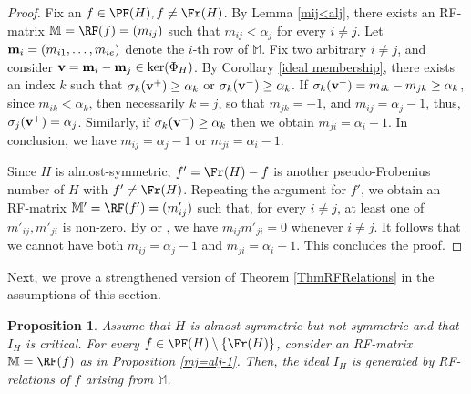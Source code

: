 \documentclass[11pt,twoside]{amsart}
\newcommand{\MM}{\mathbb M}
\def\bv{{\mathbf v}}
\def\al{\alpha}
\newtheorem{prop}[Theorem]{Proposition}
\theoremstyle{definition}
\numberwithin{equation}{section}
\begin{document}
\begin{proof}
Fix an $f \in \PF(H), f \ne \Fr(H)$.
By Lemma \ref{mij<alj},
there exists an RF-matrix   $\MM = \RF(f)= (m_{ij})$ 
 such that  $m_{ij}< \al_j$ for every $i\ne j$.
Let  ${\bf m}_i = (m_{i1},  \ldots , m_{ie})$ denote the 
$i$-th row of $\MM$. 
 Fix two arbitrary $i \ne j$, and 
consider $\bv = {\bf m}_i - {\bf m}_j\in \ker (\Phi_H)$.
By Corollary \ref{ideal membership}, there exists an index $k$ such that   $\sigma_k({\bf v}^+) \geq \alpha_k$ or $\sigma_k({\bf v}^-) \geq \alpha_k$.
If $\sigma_k({\bf v}^+) = m_{ik}-m_{jk} \geq \alpha_k$, since $m_{ik} < \alpha_k$,
then necessarily  $k = j$, so that $m_{jk}=-1$, and $m_{ij}= \alpha_{j}-1$, thus, $\sigma_j({\bf v}^+) = \alpha_j$. 
Similarly, if $\sigma_k({\bf v}^-) \geq \alpha_k$ then we obtain $m_{ji}=\alpha_i-1$. 
In conclusion, we have $m_{ij}=\alpha_j-1$ or $m_{ji}=\alpha_i-1$.

Since $H$ is almost-symmetric, $f'= \Fr(H)-f$ is another pseudo-Frobenius number of $H$ with $f' \ne \Fr(H)$.
Repeating the argument for $f'$, we obtain an RF-matrix $\MM' =\RF(f') = (m'_{ij})$ such that, for every $i\ne j$, at least one of $m'_{ij}, m'_{ji}$ is non-zero.
By \cite[Proposition 4]{Mo} or \cite[Lemma 2.1]{E}, we have 
$m_{ij}m'_{ji}=0$ whenever $i \ne j$.
It follows that we cannot have both $m_{ij}=\alpha_j-1$ and $m_{ji}=\alpha_i-1$.
This concludes the proof.
\end{proof}





Next, we prove a strengthened version of Theorem \ref{ThmRFRelations} in the  assumptions of this section.

\begin{prop}\label{RF(f)}
Assume 
that $H$  is almost symmetric but not symmetric and that $I_H$ is critical.
For every $f \in \PF(H)\setminus\{ \Fr(H)\}$,
consider an RF-matrix $\MM=\RF(f)$ as in Proposition \ref{mj=alj-1}.
Then, the ideal  $I_H$ is generated by RF-relations of $f$ arising from $\MM$.
\end{prop}
\end{document}
